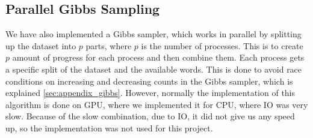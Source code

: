 \subsection{Parallel Gibbs Sampling}\label{sec:appendix_para_gibbs}
We have also implemented a Gibbs sampler, which works in parallel by splitting up the dataset into $p$ parts, where $p$ is the number of processes.
This is to create $p$ amount of progress for each process and then combine them.
Each process gets a specific split of the dataset and the available words. 
This is done to avoid race conditions on increasing and decreasing counts in the Gibbs sampler, which is explained \autoref{sec:appendix_gibbs}.
However, normally the implementation of this algorithm is done on GPU, where we implemented it for CPU, where IO was very slow.
Because of the slow combination, due to IO, it did not give us any speed up, so the implementation was not used for this project. 
